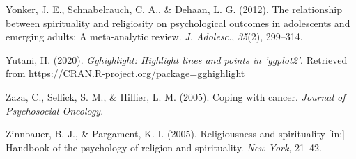 \documentclass[
  english,
  man]{apa6}
\begin{document}
\leavevmode\hypertarget{ref-Yonker2012-zg}{}%
Yonker, J. E., Schnabelrauch, C. A., \& Dehaan, L. G. (2012). The relationship between spirituality and religiosity on psychological outcomes in adolescents and emerging adults: A meta-analytic review. \emph{J. Adolesc.}, \emph{35}(2), 299--314.

\leavevmode\hypertarget{ref-R-gghighlight}{}%
Yutani, H. (2020). \emph{Gghighlight: Highlight lines and points in 'ggplot2'}. Retrieved from \url{https://CRAN.R-project.org/package=gghighlight}

\leavevmode\hypertarget{ref-Zaza2005-ac}{}%
Zaza, C., Sellick, S. M., \& Hillier, L. M. (2005). Coping with cancer. \emph{Journal of Psychosocial Oncology}.

\leavevmode\hypertarget{ref-Zinnbauer2005-vz}{}%
Zinnbauer, B. J., \& Pargament, K. I. (2005). Religiousness and spirituality {[}in:{]} Handbook of the psychology of religion and spirituality. \emph{New York}, 21--42.

\endgroup
\end{document}
